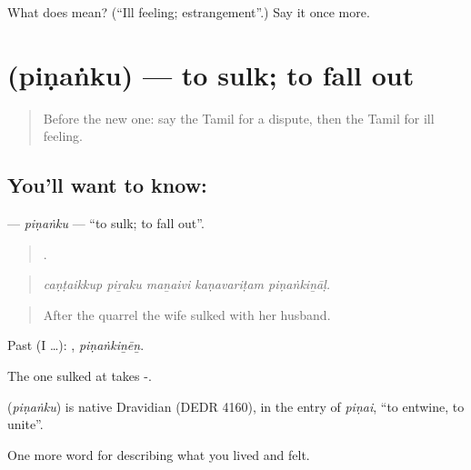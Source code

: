 \begin{tcolorbox}[breakable,colback=teal!4,colframe=teal!35!black,title={Before you move on}]
What does  mean? (\textquotedblleft{}Ill feeling; estrangement\textquotedblright{}.) Say it once more.
\end{tcolorbox}
\section[\texorpdfstring{\ta{பிணங்கு} (piṇaṅku)}{பிணங்கு (piṇaṅku)}]{ (piṇaṅku) — to sulk; to fall out}

\label{lesson:TA-C501-pinanku}



\begin{quote}
Before the new one: say the Tamil for a dispute, then the Tamil for ill feeling.
\end{quote}

\subsection*{You'll want to know: }
\textbf{} — \emph{piṇaṅku} — \textquotedblleft{}to sulk; to fall out\textquotedblright{}.

\begin{quote}
    .
\end{quote}

\begin{quote}
\emph{caṇṭaikkup piṟaku maṉaivi kaṇavariṭam piṇaṅkiṉāḷ.}
\end{quote}

\begin{quote}
After the quarrel the wife sulked with her husband.
\end{quote}

Past (I …): , \emph{piṇaṅkiṉēṉ}.

The one sulked at takes -.

\begin{cousinweb}
\textbf{} (\emph{piṇaṅku}) is native Dravidian (DEDR 4160), in the entry of  \emph{piṇai}, \textquotedblleft{}to entwine, to unite\textquotedblright{}.
\end{cousinweb}

\begin{grammarlens}[title={What you've built}]
One more word for describing what you lived and felt.
\end{grammarlens}

